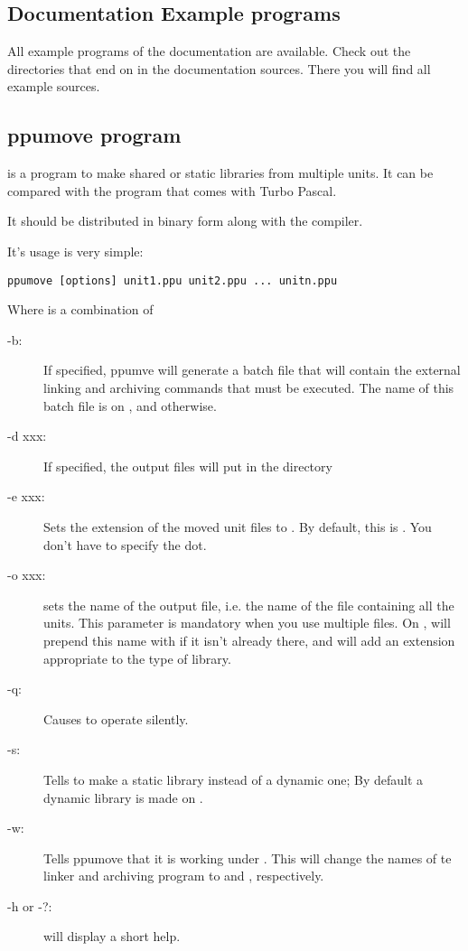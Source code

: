 \documentclass{report}
\begin{document}
\subsection{Documentation Example programs}

All example programs of the documentation are available. Check out the
directories that end on  in the documentation sources. There you
will find all example sources.
\subsection{ppumove program}

 is a program to make shared or static libraries from
multiple units. It can be compared with the  program that 
comes with
Turbo Pascal.

It should be distributed in binary form along with the compiler.

It's usage is very simple:
\begin{verbatim}
ppumove [options] unit1.ppu unit2.ppu ... unitn.ppu
\end{verbatim}
Where  is a combination of
\begin{description}
\item[-b:\ ] If specified, ppumve will generate a batch file that will
contain the external linking and archiving commands that must be 
executed. The name of this batch file is  on \linux, and 
 otherwise. 
\item[-d xxx:\ ] If specified, the output files will put in the directory
\item[-e xxx:\ ] Sets the extension of the moved unit files to .
By default, this is . You don't have to specify the dot.
\item[-o xxx:\ ] sets the name of the output file, i.e. the name of the file
containing all the units. This parameter is mandatory when you use multiple
files. On \linux,  will prepend this name with  if it isn't
already there, and will add an extension appropriate to the type of library.
\item [-q:\ ] Causes  to operate silently.
\item [-s:\ ] Tells  to make a static library instead of a 
dynamic one; By default a dynamic library is made on \linux.
\item [-w:\ ] Tells ppumove that it is working under \windowsnt. This will
change the names of te linker and archiving program to  and
, respectively.
\item[-h or -?:\ ] will display a short help.
\end{description}
\end{document}
